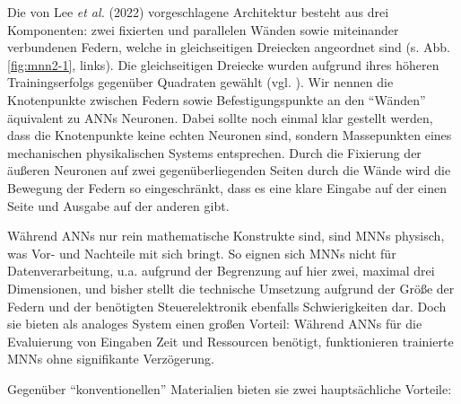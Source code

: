 \documentclass[10pt]{scrartcl}
\newcommand{\lee}{Lee {\itshape et al.} (2022)}
\begin{document}

Die von \lee{} vorgeschlagene Architektur besteht aus drei Komponenten: zwei fixierten und parallelen Wänden sowie miteinander verbundenen Federn, welche in gleichseitigen Dreiecken angeordnet sind  (s. Abb. \ref{fig:mnn2-1}, links).
Die gleichseitigen Dreiecke wurden aufgrund ihres höheren Trainingserfolgs gegenüber Quadraten gewählt (vgl. \cite[Abb. 5]{Lee2022}).
Wir nennen die Knotenpunkte zwischen Federn sowie Befestigungspunkte an den \enquote{Wänden} äquivalent zu ANNs Neuronen.
Dabei sollte noch einmal klar gestellt werden, dass die Knotenpunkte keine echten Neuronen sind, sondern Massepunkten eines mechanischen physikalischen Systems entsprechen.
Durch die Fixierung der äußeren Neuronen auf zwei gegenüberliegenden Seiten durch die Wände wird die Bewegung der Federn so eingeschränkt, dass es eine klare Eingabe auf der einen Seite und Ausgabe auf der anderen gibt.

Während ANNs nur rein mathematische Konstrukte sind, sind MNNs physisch, was Vor- und Nachteile mit sich bringt. 
So eignen sich MNNs nicht für Datenverarbeitung, u.a. aufgrund der Begrenzung auf hier zwei, maximal drei Dimensionen, und bisher stellt die technische Umsetzung aufgrund der Größe der Federn und der benötigten Steuerelektronik ebenfalls Schwierigkeiten dar.
Doch sie bieten als analoges System einen großen Vorteil: Während ANNs für die Evaluierung von Eingaben Zeit und Ressourcen benötigt, funktionieren trainierte MNNs ohne signifikante Verzögerung.

Gegenüber \enquote{konventionellen} Materialien bieten sie zwei hauptsächliche Vorteile:
\end{document}
